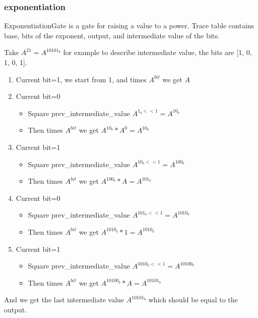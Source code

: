 \subsubsection{exponentiation}

ExponentiationGate is a gate for raising a value to a power. Trace table contains base, bits of the exponent, output, and intermediate value of the bits.

Take $A^{21} = A^{10101_b}$ for example to describe intermediate value, the bits are [1, 0, 1, 0, 1].

\begin{enumerate}
    \item Current bit=1, we start from 1, and times $A^{bit}$ we get $A$
    \item Current bit=0
    \begin{itemize}
        \item Square prev\_intermediate\_value $A^{1_b << 1} = A^{10_b}$
        \item Then times $A^{bit}$ we get $A^{10_b} * A^0 = A^{10_b}$
    \end{itemize}
    \item Current bit=1
    \begin{itemize}
        \item Square prev\_intermediate\_value $A^{10_b<<1} = A^{100_b}$
        \item Then times $A^{bit}$ we get $A^{100_b} * A = A^{101_b}$
    \end{itemize}
    \item Current bit=0
    \begin{itemize}
        \item Square prev\_intermediate\_value $A^{101_b << 1} = A^{1010_b}$
        \item Then times $A^{bit}$ we get $A^{1010_b} * 1 = A^{1010_b}$
    \end{itemize}
    \item Current bit=1
    \begin{itemize}
        \item Square prev\_intermediate\_value $A^{1010_b << 1} = A^{10100_b}$
        \item Then times $A^{bit}$ we get $A^{10100_b} * A = A^{10101_b}$
    \end{itemize}
\end{enumerate}

And we get the last intermediate value $A^{10101_b}$ which should be equal to the output.

